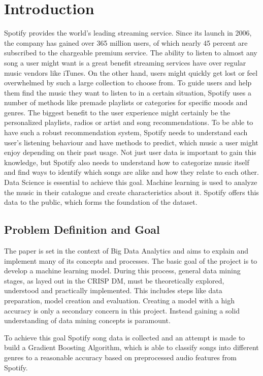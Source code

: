\section{Introduction}

Spotify provides the world's leading streaming service.
Since its launch in 2006, the company has gained over 365 million users, of
which nearly 45 percent are subscribed to the chargeable premium service.
The ability to listen to almost any song a user might want
is a great benefit streaming services have over regular music vendors
like iTunes. On the other hand, users might quickly get lost or feel overwhelmed by such
a large collection to choose from.
To guide users and help them find the music they want to listen to in a certain situation,
Spotify uses a number of methods like premade playlists or categories for specific moods and
genres. The biggest benefit to the user experience might certainly be the personalized
playlists, radios or artist and song recommendations.
To be able to have such a robust recommendation system, Spotify needs to understand each user's
listening behaviour and have methods to predict, which music a user might enjoy depending
on their past usage.
Not just user data is important to gain this knowledge, but Spotify also needs to understand
how to categorize music itself and find ways to identify which songs are alike and how they
relate to each other.
Data Science is essential to achieve this goal. Machine learning is used 
to analyze the music in their catalogue and create characteristics about it.
Spotify offers this data to the public, which forms the foundation of the dataset.

\subsection{Problem Definition and Goal}

The paper is set in the context of Big Data Analytics and aims to explain and implement
many of its concepts and processes.
The basic goal of the project is to develop a machine learning model.
During this process, general data mining stages, as layed out in the \ac{CRISP DM},
must be theoretically explored, understood and practically implemented. This includes steps like data
preparation, model creation and evaluation. Creating a model with a high accuracy is only a secondary
concern in this project. Instead gaining a solid understanding of data mining concepts is paramount.

To achieve this goal Spotify song data is collected and an attempt is made to build a Gradient Boosting
Algorithm, which is able to classify songs into different genres to a reasonable accuracy based on preprocessed
audio features from Spotify.


